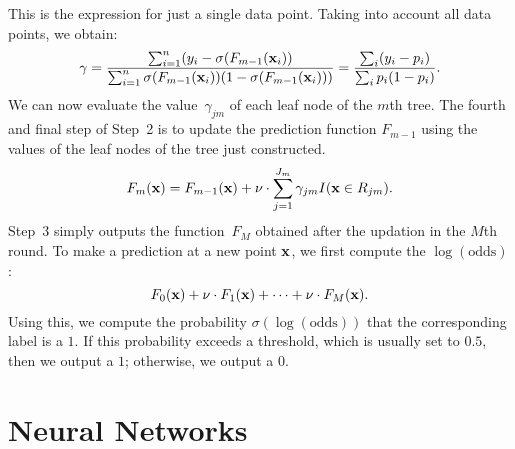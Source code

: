 This is the expression for just a single data point. Taking into account all data points, 
we obtain:
\begin{equation}
\label{eqn:leaf_value}
    \gamma = \frac{\sum_{i = 1}^{n} (y_i - \sigma(F_{m - 1}(\mathbf{x}_i))}{\sum_{i = 1}^{n}\sigma(F_{m - 1}(\mathbf{x}_i)) (1 - \sigma(F_{m - 1}(\mathbf{x}_i)))}
           = \frac{\sum_i (y_i - p_i)}{\sum_i p_i (1 - p_i)}.
\end{equation}
We can now evaluate the value~$\gamma_{j m}$ of each leaf node of the $m$th tree.
The fourth and final step of Step~2 is to update the prediction function 
$F_{m - 1}$ using the values of the leaf nodes of the tree just constructed.
\[
    F_{m}(\mathbf{x}) = F_{m - 1}(\mathbf{x}) + 
            \nu \cdot \sum_{j = 1}^{J_m} \gamma_{j m} I(\mathbf{x} \in R_{j m}).
\] 
Step~3 simply outputs the function~$F_{M}$ obtained after the updation in the 
$M$th round. To make a prediction at a new point $\mathbf{x}$, we first compute
the $\log (\text{odds})$:
\[
    F_0(\mathbf{x}) + \nu \cdot F_1(\mathbf{x}) + \cdots + \nu \cdot F_M(\mathbf{x}).
\]
Using this, we compute the probability $\sigma(\log (\text{odds}))$ that the 
corresponding label is a $1$. If this probability exceeds a threshold, which 
is usually set to $0.5$, then we output a $1$; otherwise, we output a $0$.  

\chapter{Neural Networks}

